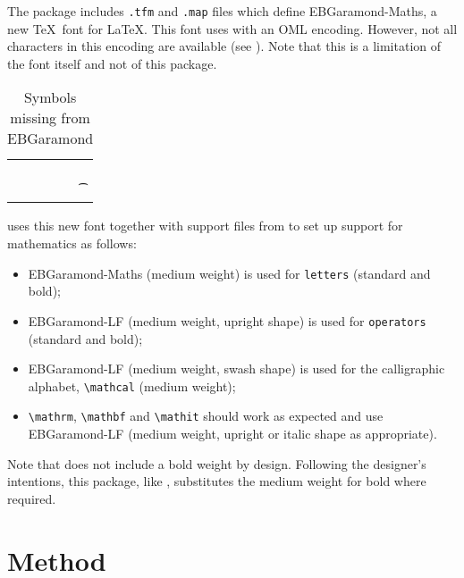 \documentclass[12pt,british,a4paper]{article}
\begin{document}
The package includes \verb|.tfm| and \verb|.map| files which define EBGaramond-Maths, a new \TeX\ font for \LaTeX.
This font uses  with an OML encoding.
However, not all characters in this encoding are available (see ).
Note that this is a limitation of the font itself and not of this package.

\begin{table}
  \centering
  \begin{tabular}{llll}
	\toprule
	\string\leftharpoonup & \string\triangleright & \string\flat & \string\smile\\
	\string\leftharpoondown & \string\triangleleft &  \string\natural & \string\frown\\
	\string\rightharpoonup & \string\star & \string\sharp & \string\vec\\
	\string\rightharpoondown & \string\partial & & \string\t\\
	\bottomrule
  \end{tabular}
  \caption{Symbols missing from EBGaramond}\label{tab:dim}
\end{table}


 uses this new font together with support files from  to set up support for mathematics as follows:
\begin{itemize}
  \item EBGaramond-Maths (medium weight) is used for \verb|letters| (standard and bold);
  \item EBGaramond-LF (medium weight, upright shape) is used for \verb|operators| (standard and bold);
  \item EBGaramond-LF (medium weight, swash shape) is used for the calligraphic alphabet, \verb|\mathcal| (medium weight);
  \item \verb|\mathrm|, \verb|\mathbf| and \verb|\mathit| should work as expected and use EBGaramond-LF (medium weight, upright or italic shape as appropriate).
\end{itemize}

Note that  does not include a bold weight by design.
Following the designer's intentions, this package, like , substitutes the medium weight for bold where required.

\section{Method}\label{sec:dull}
\end{document}
